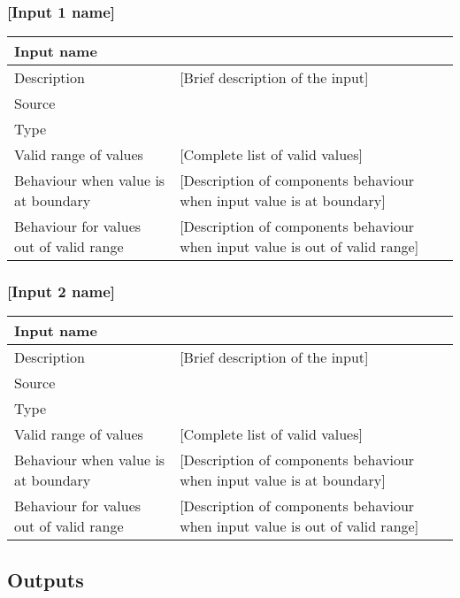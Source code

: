 \subsubsection{[Input 1 name]}

\begin{longtable}{p{}p{}}
\toprule
Input name				& \ttfamily [Name of the input] \\
\midrule
Description				& [Brief description of the input] \\
\midrule
Source					& \ttfamily [Name of the source component] \\ 
\midrule
Type					& \ttfamily [Type of the input] \\
\midrule
Valid range of values	& [Complete list of valid values] \\
\midrule
Behaviour when value is at boundary	& [Description of components behaviour when input value is at boundary] \\
\midrule
Behaviour for values out of valid range	& [Description of components behaviour when input value is out of valid range] \\
\bottomrule
\end{longtable}


\subsubsection{[Input 2 name]}

\begin{longtable}{p{}p{}}
\toprule
Input name				& \ttfamily [Name of the input] \\
\midrule
Description				& [Brief description of the input] \\
\midrule
Source					& \ttfamily [Name of the source component] \\ 
\midrule
Type					& \ttfamily [Type of the input] \\
\midrule
Valid range of values	& [Complete list of valid values] \\
\midrule
Behaviour when value is at boundary	& [Description of components behaviour when input value is at boundary] \\
\midrule
Behaviour for values out of valid range	& [Description of components behaviour when input value is out of valid range] \\
\bottomrule
\end{longtable}


\subsection{Outputs}\label{s:template_outputs}


